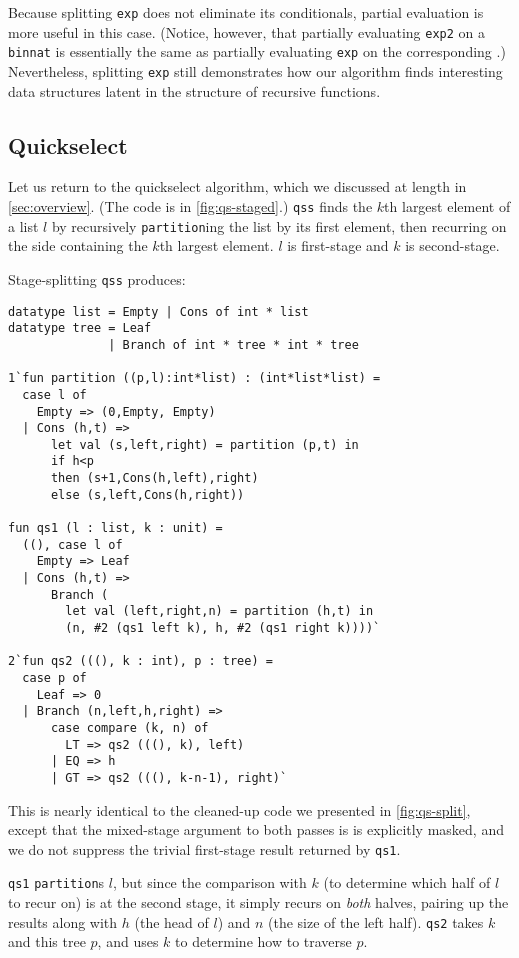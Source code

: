 Because splitting \texttt{exp} does not eliminate its conditionals, partial
evaluation is more useful in this case. (Notice, however, that partially
evaluating \texttt{exp2} on a \texttt{binnat} is essentially the same as 
partially evaluating \texttt{exp} on the corresponding \rmint.) Nevertheless,
splitting \texttt{exp} still demonstrates how our algorithm finds interesting
data structures latent in the structure of recursive functions.

\subsection{Quickselect}
\label {sec:exampleQS}

Let us return to the quickselect algorithm, which we discussed at
length in \ref{sec:overview}. (The code is in \ref{fig:qs-staged}.)
\texttt{qss} finds the $k$th largest element of a list $l$ by
recursively \texttt{partition}ing the list by its first element, then recurring
on the side containing the $k$th largest element. $l$ is first-stage and $k$ is
second-stage.

Stage-splitting \texttt{qss} produces:
%
\begin{lstlisting} 
datatype list = Empty | Cons of int * list
datatype tree = Leaf
              | Branch of int * tree * int * tree

1`fun partition ((p,l):int*list) : (int*list*list) = 
  case l of 
    Empty => (0,Empty, Empty) 
  | Cons (h,t) => 
      let val (s,left,right) = partition (p,t) in 
      if h<p 
      then (s+1,Cons(h,left),right) 
      else (s,left,Cons(h,right))

fun qs1 (l : list, k : unit) = 
  ((), case l of
    Empty => Leaf
  | Cons (h,t) => 
      Branch (
        let val (left,right,n) = partition (h,t) in
        (n, #2 (qs1 left k), h, #2 (qs1 right k))))`

2`fun qs2 (((), k : int), p : tree) = 
  case p of
    Leaf => 0
  | Branch (n,left,h,right) =>
      case compare (k, n) of 
        LT => qs2 (((), k), left) 
      | EQ => h 
      | GT => qs2 (((), k-n-1), right)`
\end{lstlisting}
%
This is nearly identical to the cleaned-up code we presented in
\ref{fig:qs-split}, except that the mixed-stage argument to both passes is
is explicitly masked, and we do not suppress the trivial first-stage result
returned by \texttt{qs1}.

\texttt{qs1} \texttt{partition}s $l$, but since the comparison with $k$ (to
determine which half of $l$ to recur on) is at the second stage, it simply
recurs on \emph{both} halves, pairing up the results along with $h$ (the head of
$l$) and $n$ (the size of the left half). \texttt{qs2} takes $k$ and this tree
$p$, and uses $k$ to determine how to traverse $p$.

